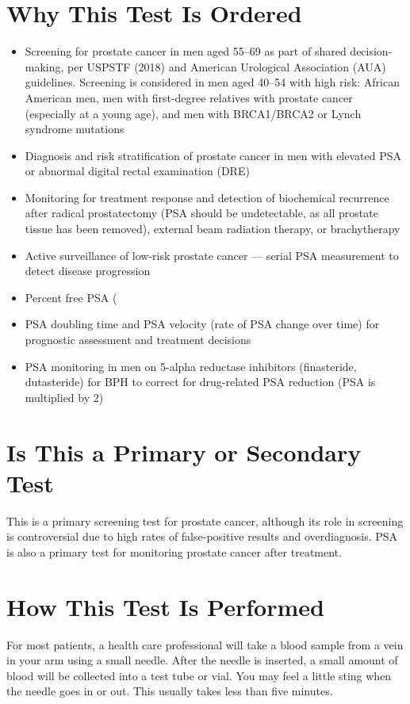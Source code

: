 \section*{Why This Test Is Ordered}
\begin{itemize}
  \item Screening for prostate cancer in men aged 55--69 as part of shared decision-making, per USPSTF (2018) and American Urological Association (AUA) guidelines. Screening is considered in men aged 40--54 with high risk: African American men, men with first-degree relatives with prostate cancer (especially at a young age), and men with BRCA1/BRCA2 or Lynch syndrome mutations
  \item Diagnosis and risk stratification of prostate cancer in men with elevated PSA or abnormal digital rectal examination (DRE)
  \item Monitoring for treatment response and detection of biochemical recurrence after radical prostatectomy (PSA should be undetectable, as all prostate tissue has been removed), external beam radiation therapy, or brachytherapy
  \item Active surveillance of low-risk prostate cancer --- serial PSA measurement to detect disease progression
  \item Percent free PSA (%
  \item PSA doubling time and PSA velocity (rate of PSA change over time) for prognostic assessment and treatment decisions
  \item PSA monitoring in men on 5-alpha reductase inhibitors (finasteride, dutasteride) for BPH to correct for drug-related PSA reduction (PSA is multiplied by 2)
\end{itemize}

\section*{Is This a Primary or Secondary Test}
This is a primary screening test for prostate cancer, although its role in screening is controversial due to high rates of false-positive results and overdiagnosis. PSA is also a primary test for monitoring prostate cancer after treatment.

\section*{How This Test Is Performed}
For most patients, a health care professional will take a blood sample from a vein in your arm using a small needle. After the needle is inserted, a small amount of blood will be collected into a test tube or vial. You may feel a little sting when the needle goes in or out. This usually takes less than five minutes.

